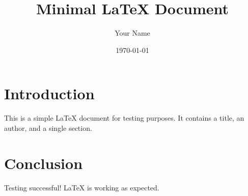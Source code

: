 \documentclass{article}
\title{Minimal LaTeX Document}
\author{Your Name}
\date{\today}
\begin{document}
\maketitle

\section{Introduction}
This is a simple LaTeX document for testing purposes. It contains a title, an author, and a single section.

\section{Conclusion}
Testing successful! LaTeX is working as expected.
\end{document}
